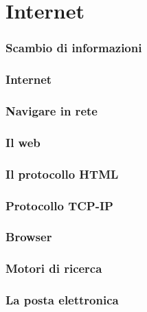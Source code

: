 \documentclass[handout]{beamer}
\begin{document}
\section{Internet}


\begin{frame}
\frametitle{Scambio di informazioni}

  

\end{frame}




\begin{frame}
\frametitle{Internet}

  
\end{frame}



\begin{frame}
\frametitle{Navigare in rete}

  

\end{frame}




\begin{frame}
\frametitle{Il web}

  

\end{frame}



\begin{frame}
\frametitle{Il protocollo HTML}

  

\end{frame}


\begin{frame}
\frametitle{Protocollo TCP-IP}

  

\end{frame}


\begin{frame}
\frametitle{Browser}


\end{frame}



\begin{frame}
\frametitle{Motori di ricerca}

  

\end{frame}


\begin{frame}
\frametitle{La posta elettronica}

  

\end{frame}
\end{document}
